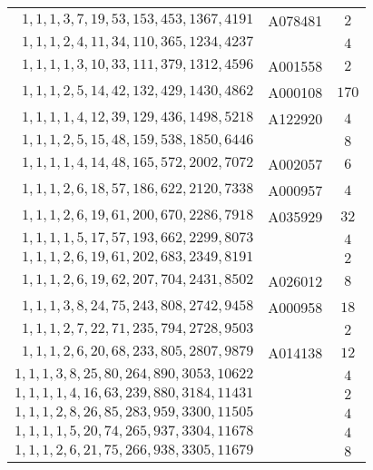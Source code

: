 \begin{longtabu}{|r|l|c|}
    \(    1,    1,    1,    3,    7,   19,   53,  153,  453, 1367, 4191\) & A078481 & \(2\)\\
    \(    1,    1,    1,    2,    4,   11,   34,  110,  365, 1234, 4237\) & 	& \(4\)\\
    \(    1,    1,    1,    1,    3,   10,   33,  111,  379, 1312, 4596\) &	A001558 & \(2\)\\
    \(    1,    1,    1,    2,    5,   14,   42,  132,  429, 1430, 4862\) &	A000108 & \(170\)\\
    \(    1,    1,    1,    1,    4,   12,   39,  129,  436, 1498, 5218\) &	A122920 & \(4\)\\
    \(    1,    1,    1,    2,    5,   15,   48,  159,  538, 1850, 6446\) & 	& \(8\)\\
    \(    1,    1,    1,    1,    4,   14,   48,  165,  572, 2002, 7072\) &	A002057 & \(6\)\\
    \(    1,    1,    1,    2,    6,   18,   57,  186,  622, 2120, 7338\) &	A000957 & \(4\)\\
    \(    1,    1,    1,    2,    6,   19,   61,  200,  670, 2286, 7918\) &	A035929 & \(32\)\\
    \(    1,    1,    1,    1,    5,   17,   57,  193,  662, 2299, 8073\) & 	& \(4\)\\
    \(    1,    1,    1,    2,    6,   19,   61,  202,  683, 2349, 8191\) &	 & \(2\)\\
    \(    1,    1,    1,    2,    6,   19,   62,  207,  704, 2431, 8502\) &	A026012 & \(8\)\\
    \(    1,    1,    1,    3,    8,   24,   75,  243,  808, 2742, 9458\) &	A000958 & \(18\)\\
    \(    1,    1,    1,    2,    7,   22,   71,  235,  794, 2728, 9503\) &	 & \(2\)\\
    \(    1,    1,    1,    2,    6,   20,   68,  233,  805, 2807, 9879\) & A014138 & \(12\)\\
    \(    1,    1,    1,    3,    8,   25,   80,  264,  890, 3053,10622\) &	 & \(4\)\\
    \(    1,    1,    1,    1,    4,   16,   63,  239,  880, 3184,11431\) &	 & \(2\)\\
    \(    1,    1,    1,    2,    8,   26,   85,  283,  959, 3300,11505\) &	 & \(4\)\\
    \(    1,    1,    1,    1,    5,   20,   74,  265,  937, 3304,11678\) &	 & \(4\)\\
    \(    1,    1,    1,    2,    6,   21,   75,  266,  938, 3305,11679\) &	& \(8\)\\

\end{longtabu}
